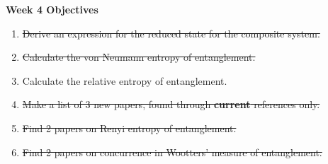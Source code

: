 \documentclass{article}
\begin{document}
\Large{\textbf{Week 4 Objectives}}
\\
\begin{enumerate}
    \item \sout{Derive an expression for the reduced state for the composite system.}
    \item \sout{Calculate the von Neumann entropy of entanglement.}
    \item Calculate the relative entropy of entanglement.
    \item \sout{Make a list of 3 new papers, found through \textbf{current} references only.}
    \item \sout{Find 2 papers on Renyi entropy of entanglement.}
    \item \sout{Find 2 papers on concurrence in Wootters' measure of entanglement.}
    


\end{enumerate}
\end{document}
